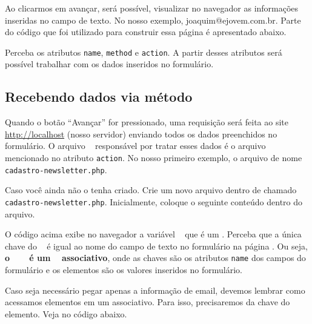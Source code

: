 
Ao clicarmos em avançar, será possível, visualizar no navegador as informações inseridas no campo
de texto. No nosso exemplo, joaquim@ejovem.com.br. Parte do código que foi utilizado para
construir essa página é apresentado abaixo.



Perceba os atributos \texttt{name}, \texttt{method} e \texttt{action}. A partir desses
atributos será possível trabalhar com os dados inseridos no formulário.

\subsection{Recebendo dados via método \metodoGET}
\label{recebendo-dados-via-metodo-get}

Quando o botão ``Avançar'' for pressionado, uma requisição será feita ao site 
\url{http://localhost} (nosso servidor) enviando todos os dados preenchidos no
formulário. O arquivo \phpextensao~ responsável por tratar esses dados é o arquivo
mencionado no atributo \texttt{action}. No nosso primeiro exemplo, o arquivo de nome
\texttt{cadastro-newsletter.php}.

Caso você ainda não o tenha criado. Crie um novo arquivo dentro de 
chamado \texttt{cadastro-newsletter.php}. Inicialmente, coloque o seguinte conteúdo dentro do arquivo.



O código acima exibe no navegador a variável \variavelget~ que é um \tipoarray. Perceba que a
única chave do \tipoarray~ é igual ao nome do campo de texto no formulário na página \html.
Ou seja, \textbf{o \tipoarray~ \variavelget~ é um \tipoarray~ associativo}, onde as chaves são
os atributos \texttt{name} dos campos do formulário e os elementos são os valores inseridos
no formulário.


Caso seja necessário pegar apenas a informação de email, devemos lembrar como acessamos 
elementos em um \tipoarray associativo. Para isso, precisaremos da chave do elemento. Veja
no código abaixo.



